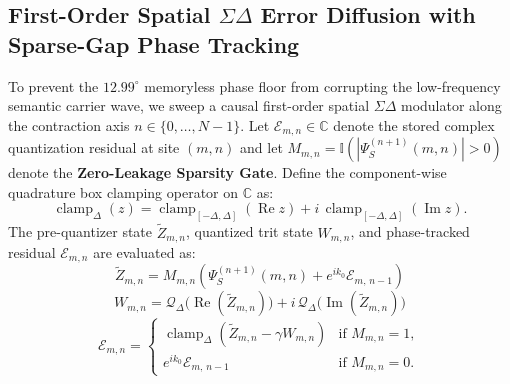 \documentclass[10pt, twocolumn, a4paper]{article}
\begin{document}
\subsection{First-Order Spatial \texorpdfstring{$\Sigma\Delta$}{Sigma-Delta} Error Diffusion with Sparse-Gap Phase Tracking}
To prevent the $12.99^\circ$ memoryless phase floor from corrupting the low-frequency semantic carrier wave, we sweep a causal first-order spatial $\Sigma\Delta$ modulator \cite{inose1962unity, oconnor2017sigmadelta, shao2019spatial} along the contraction axis $n \in \{0, \dots, N-1\}$. Let $\mathcal{E}_{m,n} \in \mathbb{C}$ denote the stored complex quantization residual at site $(m,n)$ and let $M_{m,n} = \mathbb{I}(|\Psi_S^{(n+1)}(m,n)| > 0)$ denote the \textbf{Zero-Leakage Sparsity Gate}. Define the component-wise quadrature box clamping operator on $\mathbb{C}$ as:
\begin{equation}
\operatorname{clamp}_{\Delta}(z) = \operatorname{clamp}_{[-\Delta, \Delta]}(\operatorname{Re} z) + i \, \operatorname{clamp}_{[-\Delta, \Delta]}(\operatorname{Im} z).
\label{eq:box_clamp}
\end{equation}
The pre-quantizer state $\widetilde{Z}_{m,n}$, quantized trit state $W_{m,n}$, and phase-tracked residual $\mathcal{E}_{m,n}$ are evaluated as:
\begin{equation}
\widetilde{Z}_{m,n} = M_{m,n} \left( \Psi_S^{(n+1)}(m,n) + e^{i k_0} \mathcal{E}_{m, \, n-1} \right)
\label{eq:sd_prequant}
\end{equation}
\begin{equation}
W_{m,n} = \mathcal{Q}_{\Delta}\big(\operatorname{Re}(\widetilde{Z}_{m,n})\big) + i \, \mathcal{Q}_{\Delta}\big(\operatorname{Im}(\widetilde{Z}_{m,n})\big)
\label{eq:sd_quant}
\end{equation}
\begin{equation}
\mathcal{E}_{m,n} = \begin{cases}
\operatorname{clamp}_{\Delta}\!\left(\widetilde{Z}_{m,n} - \gamma W_{m,n}\right) & \text{if } M_{m,n} = 1, \\
e^{i k_0} \mathcal{E}_{m, \, n-1} & \text{if } M_{m,n} = 0.
\end{cases}
\label{eq:sd_residual}
\end{equation}
\end{document}
